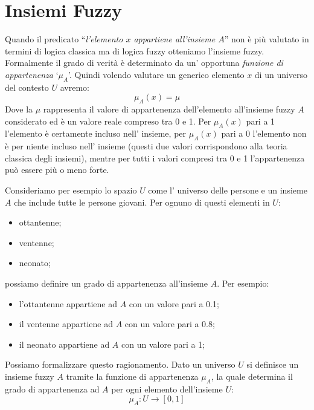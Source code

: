 \documentclass[a4paper,12pt]{report}
\begin{document}
\section{Insiemi Fuzzy}
Quando il predicato ``\textit{l'elemento $x$ appartiene all'insieme $A$}'' non è  più valutato in termini di logica classica ma di logica fuzzy otteniamo l'insieme fuzzy. 
Formalmente il grado di verità è determinato da un' opportuna \textit{funzione di appartenenza} `$\mu_A$'. Quindi volendo valutare un generico elemento $x$ di un universo del contesto $U$ avremo:
\begin{equation*}
    \mu_A(x) = \mu
\end{equation*}
\noindent 
Dove la $\mu$ rappresenta il valore di appartenenza dell'elemento all'insieme fuzzy $A$ considerato ed è un valore reale compreso tra 0 e 1. 
Per $\mu_A(x)$ pari a 1 l’elemento è certamente incluso nell’ insieme, per $\mu_A(x)$ pari a 0
l’elemento non è per niente incluso nell’ insieme (questi due valori corrispondono alla teoria classica degli insiemi), mentre per tutti i valori compresi tra 0 e 1 l’appartenenza può essere più o meno forte.

\bigskip

Consideriamo per esempio lo spazio $U$ come l' universo delle persone e un insieme $A$ che include tutte le persone giovani. Per ognuno di questi elementi in $U$:
\begin{itemize}
    \item ottantenne;
    \item ventenne;
    \item neonato;
\end{itemize}
possiamo definire un grado di appartenenza all'insieme $A$. Per esempio:
\begin{itemize}
    \item l'ottantenne appartiene ad $A$ con un valore pari a 0.1;
    \item il ventenne appartiene ad $A$ con un valore pari a 0.8;
    \item il neonato appartiene ad $A$ con un valore pari a 1;
\end{itemize}
Possiamo formalizzare questo ragionamento.
Dato un universo $U$ si definisce un insieme fuzzy $A$ tramite la funzione di appartenenza $\mu_A$, la quale determina il grado di appartenenza ad $A$ per ogni elemento dell'insieme $U$:
\begin{equation*}
    \mu_A : U \to [0,1]
\end{equation*}
\end{document}
